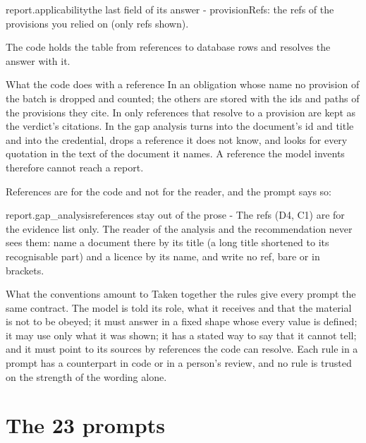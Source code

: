 \begin{promptexcerpt}{report.applicability}{the last field of its answer}
- provisionRefs: the refs of the provisions you relied on (only refs shown).
\end{promptexcerpt}

The code holds the table from references to database rows and resolves the answer with it.

\begin{codebox}{What the code does with a reference}
In  an obligation whose  name no provision of
the batch is dropped and counted; the others are stored with the ids and paths of the
provisions they cite. In  only references that resolve to a provision
are kept as the verdict's citations. In the gap analysis  turns
 into the document's id and title and  into the credential, drops a reference
it does not know, and looks for every quotation in the text of the document it names. A
reference the model invents therefore cannot reach a report.
\end{codebox}

References are for the code and not for the reader, and the prompt says so:

\begin{promptexcerpt}{report.gap_analysis}{references stay out of the prose}
- The refs (D4, C1) are for the evidence list only. The reader of the analysis and
  the recommendation never sees them: name a document there by its title (a long
  title shortened to its recognisable part) and a licence by its name, and write no
  ref, bare or in brackets.
\end{promptexcerpt}

\begin{aibox}{What the conventions amount to}
Taken together the rules give every prompt the same contract. The model is told its role, what
it receives and that the material is not to be obeyed; it must answer in a fixed shape whose
every value is defined; it may use only what it was shown; it has a stated way to say that it
cannot tell; and it must point to its sources by references the code can resolve. Each rule in
a prompt has a counterpart in code or in a person's review, and no rule is trusted on the
strength of the wording alone.
\end{aibox}


\section{The 23 prompts}\label{sec:prompts:all}

